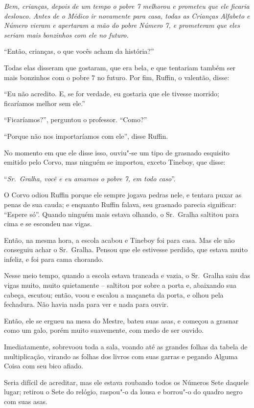 \emph{Bem, crianças, depois de um tempo o pobre 7 melhorou e prometeu
que ele ficaria deslouco. Antes de o Médico ir novamente para casa,
todas as Crianças Alfabeto e Número vieram e apertaram a mão do pobre
Número 7, e prometeram que eles seriam mais bonzinhos com ele no
futuro.}

\smallskip
``Então, crianças, o que vocês acham da história?''

Todas elas disseram que gostaram, que era bela, e que tentariam também
ser mais bonzinhos com o pobre 7 no futuro. Por fim, Ruffin, o valentão,
disse:

``Eu não acredito. E, se for verdade, eu gostaria que ele tivesse
morrido; ficaríamos melhor sem ele.''

``Ficaríamos?'', perguntou o professor. ``Como?''

``Porque não nos importaríamos com ele'', disse Ruffin.

No momento em que ele disse isso, ouviu"-se um tipo de grasnado esquisito
emitido pelo Corvo, mas ninguém se importou, exceto Tineboy, que disse:

``\emph{Sr.~Gralha, você e eu amamos o pobre 7, em todo caso}''.

O Corvo odiou Ruffin porque ele sempre jogava pedras nele, e tentara
puxar as penas de sua cauda; e enquanto Ruffin falava, seu grasnado
parecia significar: ``Espere só''. Quando ninguém mais estava olhando, o
Sr.~Gralha saltitou para cima e se escondeu nas vigas.

Então, na mesma hora, a escola acabou e Tineboy foi para casa. Mas ele
não conseguiu achar o Sr.~Gralha. Pensou que ele estivesse perdido, que
estava muito infeliz, e foi para cama chorando.

Nesse meio tempo, quando a escola estava trancada e vazia, o Sr.~Gralha
saiu das vigas muito, muito quietamente -- saltitou por sobre a porta e,
abaixando sua cabeça, escutou; então, voou e escalou a maçaneta da
porta, e olhou pela fechadura. Não havia nada para ver e nada para
ouvir.

Então, ele se ergueu na mesa do Mestre, bateu suas asas, e começou a
grasnar como um galo, porém muito suavemente, com medo de ser ouvido.

Imediatamente, sobrevoou toda a sala, voando até as grandes folhas da
tabela de multiplicação, virando as folhas dos livros com suas garras e
pegando Alguma Coisa com seu bico afiado.

Seria difícil de acreditar, mas ele estava roubando todos os Números
Sete daquele lugar; retirou o Sete do relógio, raspou"-o da lousa e
borrou"-o do quadro negro com suas asas.


